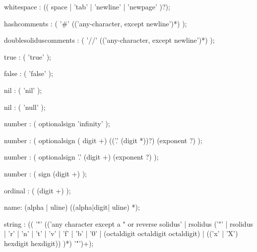 \documentclass[twoside]{memarticle}
\begin{document}
\begin{rail}
whitespace : (( space | 'tab' | 'newline' | 'newpage' )?);
\end{rail}

\begin{rail}
hashcomments : ( '\#' (('any-character, except newline')*) );
\end{rail}

\begin{rail}
doublesoliduscomments : ( '//' (('any-character, except newline')*) );
\end{rail}

\begin{rail}
true : ( 'true' );
\end{rail}

\begin{rail}
false : ( 'false' );
\end{rail}

\begin{rail}
nil : ( 'nil' );
\end{rail}

\begin{rail}
nil : ( 'null' );
\end{rail}

\begin{rail}
number : ( optionalsign 'infinity' );
\end{rail}

\begin{rail}
number : ( optionalsign ( digit +) (('.' (digit *))?) (exponent ?) );
\end{rail}

\begin{rail}
number : ( optionalsign '.' (digit +) (exponent ?) );
\end{rail}

\begin{rail}
number : ( sign (digit +) );
\end{rail}

\begin{rail}
ordinal : ( (digit +) );
\end{rail}

\begin{rail}
name: (alpha | uline) ((alpha|digit| uline) *);
\end{rail}

\begin{rail}
string : (( '"' (('any character except a " or reverse solidus' |
             rsolidus ('"' | rsolidus | 'r' | 'n' | 't' | 'v' |
                       'f' | 'b' | '0' | (octaldigit octaldigit octaldigit) |
                       (('x' | 'X') hexdigit hexdigit)) )*)
           '"')+);
\end{rail}
\end{document}
